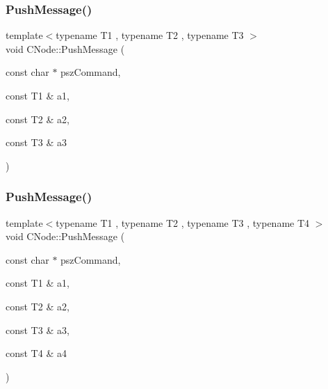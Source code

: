 \mbox{\label{class_c_node_a79355956a00c38d855b986a34e7ba444}} 
\subsubsection{\texorpdfstring{Push\+Message()}{PushMessage()}\hspace{0.1cm}{\footnotesize\ttfamily [4/13]}}
{\footnotesize\ttfamily template$<$typename T1 , typename T2 , typename T3 $>$ \\
void C\+Node\+::\+Push\+Message (\begin{DoxyParamCaption}\item[{const char $\ast$}]{psz\+Command,  }\item[{const T1 \&}]{a1,  }\item[{const T2 \&}]{a2,  }\item[{const T3 \&}]{a3 }\end{DoxyParamCaption})\hspace{0.3cm}{\ttfamily [inline]}}

\mbox{\label{class_c_node_a2958ee10e2c96ef647787bce80196079}} 
\subsubsection{\texorpdfstring{Push\+Message()}{PushMessage()}\hspace{0.1cm}{\footnotesize\ttfamily [5/13]}}
{\footnotesize\ttfamily template$<$typename T1 , typename T2 , typename T3 , typename T4 $>$ \\
void C\+Node\+::\+Push\+Message (\begin{DoxyParamCaption}\item[{const char $\ast$}]{psz\+Command,  }\item[{const T1 \&}]{a1,  }\item[{const T2 \&}]{a2,  }\item[{const T3 \&}]{a3,  }\item[{const T4 \&}]{a4 }\end{DoxyParamCaption})\hspace{0.3cm}{\ttfamily [inline]}}

\mbox{\label{class_c_node_a1f58deeed29baf57c49dae177f8be826}} 
